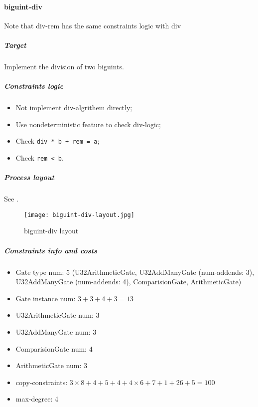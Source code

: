 \paragraph{biguint-div}

Note that div-rem has the same constraints logic with div

\subparagraph{Target}
Implement the division of two biguints.

\subparagraph{Constraints logic}
\begin{itemize}
    \item Not implement div-algrithem directly;
    \item Use nondeterministic feature to check div-logic;
    \item Check \verb|div * b + rem = a|;
    \item Check \verb|rem < b|.
\end{itemize}

\subparagraph{Process layout}
See .
\begin{figure}[!ht]
    \centering
    \texttt{[image: biguint-div-layout.jpg]}
    \caption{biguint-div layout}
    \label{fig:biguint-div-layout}
\end{figure}

\subparagraph{Constraints info and costs}
\begin{itemize}
    \item Gate type num: 5 (U32ArithmeticGate, U32AddManyGate (num-addends: 3), U32AddManyGate (num-addends: 4), ComparisionGate, ArithmeticGate)
    \item Gate instance num: $3 + 3 + 4 + 3 = 13$
    \item U32ArithmeticGate num: 3
    \item U32AddManyGate num: 3
    \item ComparisionGate num: 4
    \item ArithmeticGate num: 3
    \item copy-constraints: $3 \times 8 + 4 + 5 + 4 + 4 \times 6 + 7 + 1 + 26 + 5 = 100$
    \item max-degree: 4
\end{itemize}
